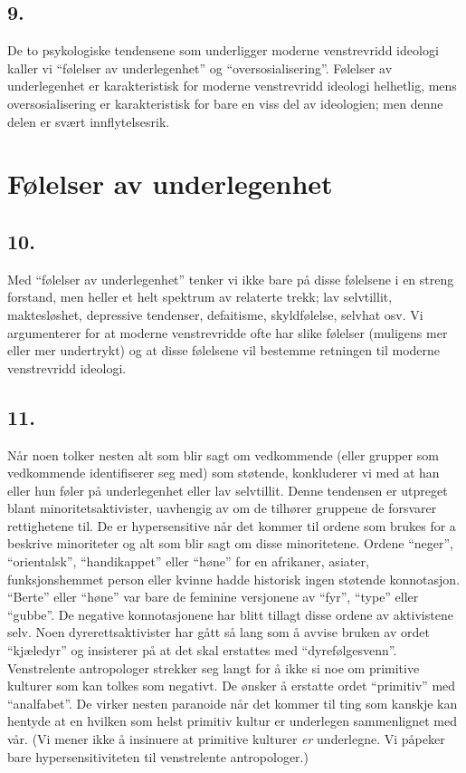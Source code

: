 \documentclass[oneside]{book}
\begin{document}
\section*{9.}
De to psykologiske tendensene som underligger moderne venstrevridd ideologi
kaller vi ``følelser av underlegenhet'' og ``oversosialisering''. Følelser av
underlegenhet er karakteristisk for moderne venstrevridd ideologi helhetlig,
mens oversosialisering er karakteristisk for bare en viss del av ideologien;
men denne delen er svært innflytelsesrik.

\chapter{Følelser av underlegenhet}

\section*{10.}
Med ``følelser av underlegenhet'' tenker vi ikke bare på disse følelsene i en
streng forstand, men heller et helt spektrum av relaterte trekk; lav
selvtillit, maktesløshet, depressive tendenser, defaitisme, skyldfølelse,
selvhat osv. Vi argumenterer for at moderne venstrevridde ofte har slike
følelser (muligens mer eller mer undertrykt) og at disse følelsene vil bestemme
retningen til moderne venstrevridd ideologi.

\section*{11.}
Når noen tolker nesten alt som blir sagt om vedkommende (eller grupper som
vedkommende identifiserer seg med) som støtende, konkluderer vi med at han
eller hun føler på underlegenhet eller lav selvtillit. Denne tendensen er
utpreget blant minoritetsaktivister, uavhengig av om de tilhører gruppene de
forsvarer rettighetene til. De er hypersensitive når det kommer til ordene som
brukes for a beskrive minoriteter og alt som blir sagt om disse minoritetene.
Ordene ``neger'', ``orientalsk'', ``handikappet'' eller ``høne'' for en
afrikaner, asiater, funksjonshemmet person eller kvinne hadde historisk ingen
støtende konnotasjon. ``Berte'' eller ``høne'' var bare de feminine versjonene
av ``fyr'', ``type'' eller ``gubbe''. De negative konnotasjonene har blitt
tillagt disse ordene av aktivistene selv. Noen dyrerettsaktivister har gått så
lang som å avvise bruken av ordet ``kjæledyr'' og insisterer på at det skal
erstattes med ``dyrefølgesvenn''. Venstrelente antropologer strekker seg langt
for å ikke si noe om primitive kulturer som kan tolkes som negativt. De ønsker
å erstatte ordet ``primitiv'' med ``analfabet''. De virker nesten paranoide når
det kommer til ting som kanskje kan hentyde at en hvilken som helst primitiv
kultur er underlegen sammenlignet med vår. (Vi mener ikke å insinuere at
primitive kulturer {\em er} underlegne. Vi påpeker bare hypersensitiviteten til
venstrelente antropologer.)
\end{document}
